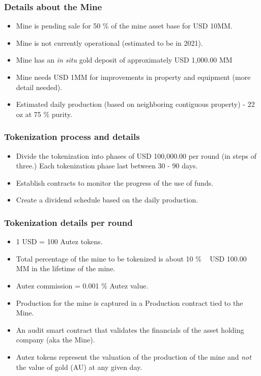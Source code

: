 \documentclass{beamer}
\begin{document}
\begin{frame}
\frametitle{Details about the Mine}
\begin{minipage}{\textwidth}
  \begin{itemize}
    \item  Mine is pending sale for 50 \% of the mine asset base for USD 10MM.
    \item  Mine is not currently operational (estimated to be in 2021).
    \item  Mine has an \textit{in situ} gold deposit of approximately USD 1,000.00 MM
    \item  Mine needs USD 1MM for improvements in property and equipment (more detail needed).
    \item  Estimated daily production (based on neighboring contiguous property) - 22 oz at 75 \% purity.
  \end{itemize}
\end{minipage}
\end{frame}

\begin{frame}
\frametitle{Tokenization process and details}
\begin{minipage}{\textwidth}
  \begin{itemize}
    \item  Divide the tokenization into phases of USD 100,000.00 per round (in steps of three.) Each tokenization phase last between 30 - 90 days.
    \item  Establish contracts to monitor the progress of the use of funds.
    \item  Create a dividend schedule based on the daily production.
  \end{itemize}
  \end{minipage}
\end{frame}

\begin{frame}
\frametitle {Tokenization details per round}
\begin{minipage}{\textwidth}
  \begin{itemize}
    \item  1 USD = 100 Autez tokens.
    \item  Total percentage of the mine to be tokenized is about 10 \% ~ USD 100.00 MM in the lifetime of the mine.
    \item  Autez commission = 0.001 \% Autez value.
    \item  Production for the mine is captured in a Production contract tied to the Mine.
    \item  An audit smart contract that validates the financials of the asset holding company (aka the Mine).
    \item  Autez tokens represent the valuation of the production of the mine and \textit{not} the value of gold (AU) at any given day.
  \end{itemize}
  \end{minipage}
\end{frame}
\end{document}
